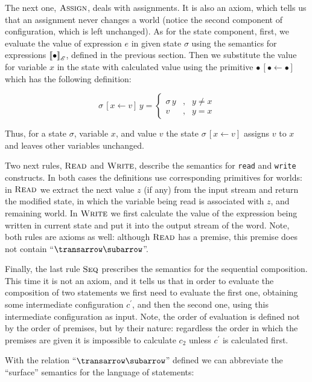 The next one, $\textsc{Assign}$, deals with assignments. It is also an axiom, which tells us that an
assignment never changes a world (notice the second component of configuration, which is left unchanged).
As for the state component, first, we evaluate the value of expression $e$ in given state $\sigma$ using
the semantics for expressions $\sembr{\bullet}^\ph_\mathscr{E}$, defined in the previous section. Then we
substitute the value for variable $x$ in the state with calculated value using the primitive $\bullet\,[\bullet\gets \bullet]$
which has the following definition:

\[
\sigma\,[x\gets v]\,y=\left\{\begin{array}{rcl}
                                \sigma\,y & , & y \ne x\\
                                v & , & y = x
                             \end{array}
                   \right.
\]

Thus, for a state $\sigma$, variable $x$, and value $v$ the state $\sigma\,[x\gets v]$ assigns $v$ to $x$ and leaves other
variables unchanged.

Two next rules, $\textsc{Read}$ and $\textsc{Write}$, describe the semantics for \lstinline|read| and
\lstinline|write| constructs. In both cases the definitions use corresponding primitives for worlds: in $\textsc{Read}$
we extract the next value $z$ (if any) from the input stream and return the modified state, in which the variable being
read is associated with $z$, and remaining world. In $\textsc{Write}$ we first calculate the value of the expression
being written in current state and put it into the output stream of the word. Note, both rules are axioms as well:
although $\textsc{Read}$ has a premise, this premise does not contain ``$\transrel$''.

Finally, the last rule $\textsc{Seq}$ prescribes the semantics for the sequential composition. This time it is
not an axiom, and it tells us that in order to evaluate the composition of two statements we first need to
evaluate the first one, obtaining some intermediate configuration $c^\prime$, and then the second one, using
this intermediate configuration as input. Note, the order of evaluation is defined not by the order of
premises, but by their nature: regardless the order in which the premises are given it is impossible
to calculate $c_2$ unless $c^\prime$ is calculated first.

With the relation ``$\transrel$'' defined we can abbreviate the ``surface'' semantics for the language of statements:

